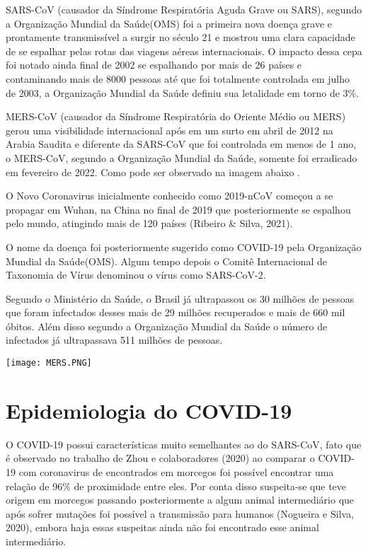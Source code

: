 SARS-CoV (causador da Síndrome Respiratória Aguda Grave ou SARS), segundo a Organização Mundial da Saúde(OMS) foi a primeira nova doença grave e prontamente transmissível a surgir no século 21 e mostrou uma clara capacidade de se espalhar pelas rotas das viagens aéreas internacionais. O impacto dessa cepa foi notado ainda final de 2002 se espalhando por mais de 26 países e contaminando mais de 8000 pessoas até que foi totalmente controlada em julho de 2003, a Organização Mundial da Saúde definiu sua letalidade em torno de 3\%.

MERS-CoV (causador da Síndrome Respiratória do Oriente Médio ou MERS) gerou uma visibilidade internacional após em um surto em abril de 2012 na Arabia Saudita e diferente da SARS-CoV que foi controlada em menos de 1 ano, o MERS-CoV, segundo a Organização Mundial da Saúde, somente foi erradicado em fevereiro de 2022. Como pode ser observado na imagem abaixo \cite{WHOEMROM33:online}. 

O Novo Coronavirus inicialmente conhecido como 2019-nCoV começou a se propagar em Wuhan, na China no final de 2019 que posteriormente se espalhou pelo mundo, atingindo mais de 120 países (Ribeiro \& Silva, 2021).

O nome da doença foi posteriormente sugerido como COVID-19 pela Organização Mundial da Saúde(OMS). Algum tempo depois o Comitê Internacional de Taxonomia de Vírus denominou o vírus como SARS-CoV-2.

Segundo o Ministério da Saúde, o Brasil já ultrapassou os 30 milhões de pessoas que foram infectados desses mais de 29 milhões recuperados e mais de 660 mil óbitos. Além disso segundo a Organização Mundial da Saúde o número de infectados já ultrapassava 511 milhões de pessoas.

\texttt{[image: MERS.PNG]}

\section{Epidemiologia do COVID-19}

O COVID-19 possui características muito semelhantes ao do SARS-CoV, fato que é observado no trabalho de Zhou e colaboradores (2020) ao comparar o COVID-19 com coronavirus de encontrados em morcegos foi possível encontrar uma relação de 96\% de proximidade entre eles. Por conta disso suspeita-se que teve origem em morcegos passando posteriormente a algum animal intermediário que após sofrer mutações foi possível a transmissão para humanos (Nogueira e Silva, 2020), embora haja essas suspeitas ainda não foi encontrado esse animal intermediário. 

